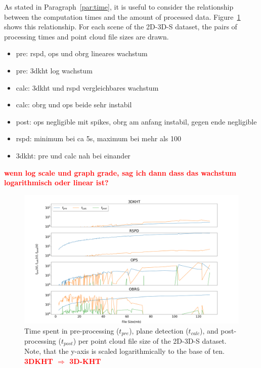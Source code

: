 \documentclass[main.tex]{subfiles}
\begin{document}
As stated in Paragraph~\ref{par:time}, it is useful to consider the relationship between the computation times and the amount of
processed data. Figure~\ref{fig:sizetimestanford} shows this relationship. For each scene of the 2D-3D-S dataset, the pairs of 
processing times and point cloud file sizes are drawn. 
\begin{itemize}
    \item pre: rspd, ops und obrg lineares wachstum
    \item pre: 3dkht log wachstum
    \item calc: 3dkht und rspd vergleichbares wachstum
    \item calc: obrg und ops beide sehr instabil
    \item post: ops negligible mit spikes, obrg am anfang instabil, gegen ende negligible
    \item rspd: minimum bei ca 5s, maximum bei mehr als 100
    \item 3dkht: pre und calc nah bei einander
\end{itemize}
\textbf{\textcolor{red}{wenn log scale und graph grade, sag ich dann dass das wachstum logarithmisch oder linear ist?}}


\begin{figure}[H]
    \centering
    \includegraphics[width=\textwidth]{images/time_size_2d3ds.png}
    \caption[Time per Cloud size 2D-3D-S]{Time spent in pre-processing ($t_{pre}$), plane detection ($t_{calc}$), 
    and post-processing ($t_{post}$) per point cloud file size of the 2D-3D-S dataset. Note, that the y-axis is 
    scaled logarithmically to the base of ten.
    \textbf{\textcolor{red}{3DKHT $\Rightarrow$ 3D-KHT}}
    }
    \label{fig:sizetimestanford}
\end{figure}
\end{document}
